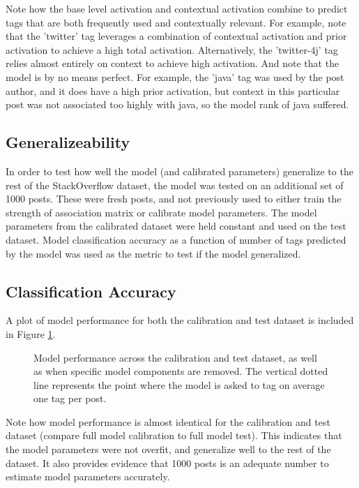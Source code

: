 \documentclass[10pt,letterpaper]{article}
\begin{document}
Note how the base level activation and contextual activation combine to predict tags that are both frequently used and contextually relevant.
For example, note that the 'twitter' tag leverages a combination of contextual activation and prior activation to achieve a high total activation.
Alternatively, the 'twitter-4j' tag relies almost entirely on context to achieve high activation.
And note that the model is by no means perfect.
For example, the 'java' tag was used by the post author, and it does have a high prior activation, but context in this particular post was not associated too highly with java, so the model rank of java suffered.

\subsection{Generalizeability}

In order to test how well the model (and calibrated parameters) generalize to the rest of the StackOverflow dataset, the model was tested on an additional set of \num{1000} posts.
These were fresh posts, and not previously used to either train the strength of association matrix or calibrate model parameters.
The model parameters from the calibrated dataset were held constant and used on the test dataset.
Model classification accuracy as a function of number of tags predicted by the model was used as the metric to test if the model generalized.

\subsection{Classification Accuracy}

A plot of model performance for both the calibration and test dataset is included in Figure \ref{fig:ROC}.

\begin{figure}[ht]
  \centering
  \caption{
    Model performance across the calibration and test dataset, as well as when specific model components are removed.
    The vertical dotted line represents the point where the model is asked to tag on average one tag per post.
  }
  \label{fig:ROC}
\end{figure}

Note how model performance is almost identical for the calibration and test dataset (compare full model calibration to full model test).
This indicates that the model parameters were not overfit, and generalize well to the rest of the dataset.
It also provides evidence that \num{1000} posts is an adequate number to estimate model parameters accurately.
\end{document}
